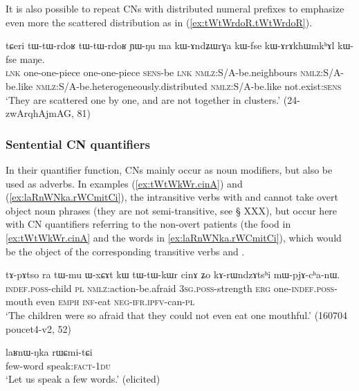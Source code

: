 It is also possible to repeat CNs with distributed numeral prefixes to emphasize even more the scattered distribution as in (\ref{ex:tWtWrdoR.tWtWrdoR}).

\begin{exe}
\ex \label{ex:tWtWrdoR.tWtWrdoR}
\gll 
tɕeri tɯ-tɯ-rdoʁ tɯ-tɯ-rdoʁ ɲɯ-ŋu ma kɯ-ɤndʑɯrɣa kɯ-fse kɯ-ɤrɤkhɯmkʰɤl kɯ-fse maŋe.  \\
\textsc{lnk} one-one-piece one-one-piece \textsc{sens}-be \textsc{lnk}  \textsc{nmlz}:S/A-be.neighbours \textsc{nmlz}:S/A-be.like \textsc{nmlz}:S/A-be.heterogeneously.distributed \textsc{nmlz}:S/A-be.like not.exist:\textsc{sens} \\
\glt  `They are scattered one by one, and are not together in clusters.' (24-zwArqhAjmAG, 81)
\end{exe}

\subsubsection{Sentential CN quantifiers}  \label{sec:sentential.CN}
In their quantifier function, CNs mainly occur as noun modifiers, but also be used as adverbs. In examples (\ref{ex:tWtWkWr.cinA}) and (\ref{ex:laRnWNka.rWCmitCi}), the intransitive verbs with  and  cannot take overt object noun phrases (they are not semi-transitive, see § XXX), but occur here with CN quantifiers referring to the non-overt patients (the food in \ref{ex:tWtWkWr.cinA} and the words in \ref{ex:laRnWNka.rWCmitCi}), which would be the object of the corresponding transitive verbs  and  .


\begin{exe}
\ex \label{ex:tWtWkWr.cinA}
\gll tɤ-pɤtso ra tɯ-mu ɯ-xɕɤt kɯ tɯ-tɯ-kɯr cinɤ ʑo kɤ-rɯndzɤtsʰi mɯ-pjɤ-cʰa-nɯ. \\
 \textsc{indef}.\textsc{poss}-child \textsc{pl} \textsc{nmlz}:action-be.afraid \textsc{3sg}.\textsc{poss}-strength \textsc{erg} one-\textsc{indef}.\textsc{poss}-mouth even \textsc{emph} \textsc{inf}-eat \textsc{neg}-\textsc{ifr}.\textsc{ipfv}-can-\textsc{pl} \\
\glt `The children were so afraid that they could not even eat one mouthful.' (160704 poucet4-v2, 52)
\end{exe}

\begin{exe}
\ex \label{ex:laRnWNka.rWCmitCi}
\gll laʁnɯ-ŋka rɯɕmi-tɕi \\
 few-word speak:\textsc{fact}-\textsc{1du} \\
\glt `Let us speak a few words.' (elicited)
\end{exe}

